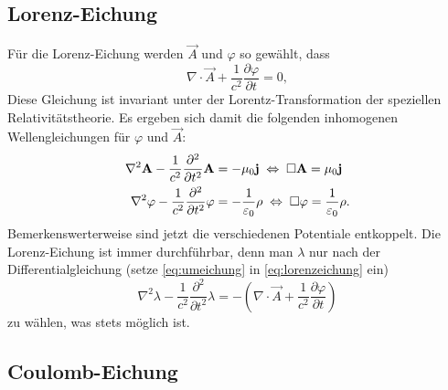 \subsection{Lorenz-Eichung}

Für die Lorenz-Eichung werden $\vec {A}$ und $\varphi $ so gewählt, dass
\begin{equation}
	\label{eq:lorenzeichung}
	\nabla \cdot \vec {A}+\frac{1}{c^{2}}\frac{\partial \varphi }{\partial t}=0,
\end{equation}
Diese Gleichung ist invariant unter der Lorentz-Transformation der speziellen Relativitätstheorie. Es ergeben sich damit die folgenden inhomogenen Wellengleichungen für $\varphi $ und $\vec {A}$:
\begin{align*}
	\nabla ^{2}\mathbf{A}-\frac{1}{c^{2}}\frac{\partial ^{2}}{\partial t^{2}}\mathbf{A} & =-\mu _{0}\mathbf{j}\;\Leftrightarrow\; \Box \mathbf{A}=\mu _{0}\mathbf{j}                              \\
	\nabla ^{2}\varphi -\frac{1}{c^{2}}\frac{\partial ^{2}}{\partial t^{2}}\varphi  & =-\frac{1}{\varepsilon _{0}}\rho \;\Leftrightarrow\; \Box \varphi =\frac{1}{\varepsilon _{0}}\rho.
\end{align*}
Bemerkenswerterweise sind jetzt die verschiedenen Potentiale entkoppelt. Die Lorenz-Eichung ist immer durchführbar, denn man $\lambda $ nur nach der Differentialgleichung (setze \eqref{eq:umeichung} in \eqref{eq:lorenzeichung} ein)
\begin{equation*}
	\nabla ^{2}\lambda -\frac{1}{c^{2}}\frac{\partial ^{2}}{\partial t^{2}}\lambda =-\left(\nabla \cdot \vec {A}+\frac{1}{c^{2}}\frac{\partial \varphi }{\partial t}\right)
\end{equation*}
zu wählen, was stets möglich ist.


\subsection{Coulomb-Eichung}

